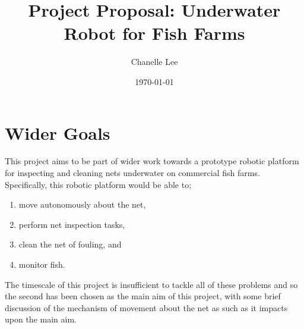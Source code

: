 \documentclass[11.5pt, twoside, a4paper]{article}
\begin{document}
\title{Project Proposal: Underwater Robot for Fish Farms}
\author{Chanelle Lee}
\date{\today}
\maketitle

\begin{abstract}

\end{abstract}

\section{Wider Goals}
This project aims to be part of wider work towards a prototype robotic platform for inspecting and cleaning nets underwater on commercial fish farms. Specifically, this robotic platform would be able to;
\begin{enumerate}
\item move autonomously about the net,
\item perform net inspection tasks,
\item clean the net of fouling, and
\item monitor fish.
\end{enumerate}
The timescale of this project is insufficient to tackle all of these problems and so the second has been chosen as the main aim of this project, with some brief discussion of the mechanism of movement about the net as such as it impacts upon the main aim.
\end{document}

